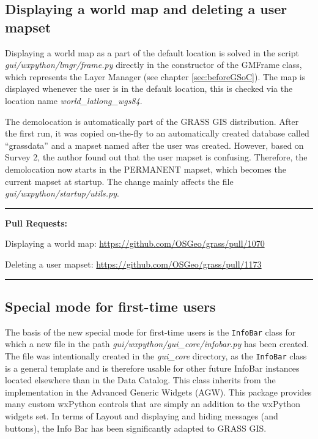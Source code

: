 \documentclass[a4paper,10pt,twoside]{article}
\begin{document}
\subsection{Displaying a world map and deleting a user mapset}

\noindent \large Displaying a world map as a part of the default
location is solved in the script \textit{gui/wxpython/lmgr/frame.py}
directly in the constructor of the GMFrame class, which represents the
Layer Manager (see chapter \ref{sec:beforeGSoC}). The map is displayed
whenever the user is in the default location, this is checked via the
location name \textit{world\_latlong\_wgs84}.

The demolocation is automatically part of the GRASS GIS
distribution. After the first run, it was copied on-the-fly to an
automatically created database called ``grassdata'' and a mapset named
after the user was created. However, based on Survey 2, the author
found out that the user mapset is confusing. Therefore, the
demolocation now starts in the PERMANENT mapset, which becomes the
current mapset at startup. The change mainly affects the file
\textit{gui/wxpython/startup/utils.py}.

\par\noindent\rule{\textwidth}{0.4pt}
\textbf{Pull Requests:}

Displaying a world map: \url{https://github.com/OSGeo/grass/pull/1070}

Deleting a user mapset: \url{https://github.com/OSGeo/grass/pull/1173}

\par\noindent\rule{\textwidth}{0.4pt}

\subsection{Special mode for first-time users}

\noindent \large The basis of the new special mode for first-time
users is the \texttt{InfoBar} class for which a new file in the path
\textit{gui/wxpython/gui\_core/infobar.py} has been created. The file
was intentionally created in the \textit{gui\_core} directory, as the
\texttt{InfoBar} class is a general template and is therefore usable
for other future InfoBar instances located elsewhere than in the Data
Catalog. This class inherits from the implementation in the Advanced
Generic Widgets (AGW). This package provides many custom wxPython
controls that are simply an addition to the wxPython widgets set. In
terms of Layout and displaying and hiding messages (and buttons), the
Info Bar has been significantly adapted to GRASS GIS.
\end{document}
